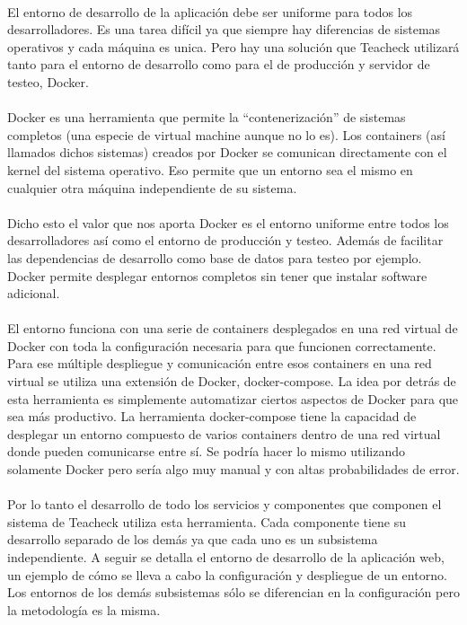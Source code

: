 \paragraph{}
El entorno de desarrollo de la aplicación debe ser uniforme para todos
los desarrolladores. Es una tarea difícil ya que siempre hay
diferencias de sistemas operativos y cada máquina es unica. Pero hay
una solución que Teacheck utilizará tanto para el entorno de
desarrollo como para el de producción y servidor de testeo, Docker.

\paragraph{}
Docker es una herramienta que permite la “contenerización” de sistemas
completos (una especie de virtual machine aunque no lo es). Los
containers (así llamados dichos sistemas) creados por Docker se
comunican directamente con el kernel del sistema operativo. Eso
permite que un entorno sea el mismo en cualquier otra máquina
independiente de su sistema.

\paragraph{}
Dicho esto el valor que nos aporta Docker es el entorno uniforme entre
todos los desarrolladores así como el entorno de producción y
testeo. Además de facilitar las dependencias de desarrollo como base
de datos para testeo por ejemplo. Docker permite desplegar entornos
completos sin tener que instalar software adicional.

\paragraph{}
El entorno funciona con una serie de containers desplegados en una red
virtual de Docker con toda la configuración necesaria para que
funcionen correctamente. Para ese múltiple despliegue y comunicación
entre esos containers en una red virtual se utiliza una extensión de
Docker, docker-compose. La idea por detrás de esta herramienta es
simplemente automatizar ciertos aspectos de Docker para que sea más
productivo. La herramienta docker-compose tiene la capacidad de
desplegar un entorno compuesto de varios containers dentro de una red
virtual donde pueden comunicarse entre sí. Se podría hacer lo mismo
utilizando solamente Docker pero sería algo muy manual y con altas
probabilidades de error.

\paragraph{}
Por lo tanto el desarrollo de todo los servicios y componentes que
componen el sistema de Teacheck utiliza esta herramienta. Cada
componente tiene su desarrollo separado de los demás ya que cada uno
es un subsistema independiente. A seguir se detalla el entorno de
desarrollo de la aplicación web, un ejemplo de cómo se lleva a cabo la
configuración y despliegue de un entorno. Los entornos de los demás
subsistemas sólo se diferencian en la configuración pero la
metodología es la misma.


